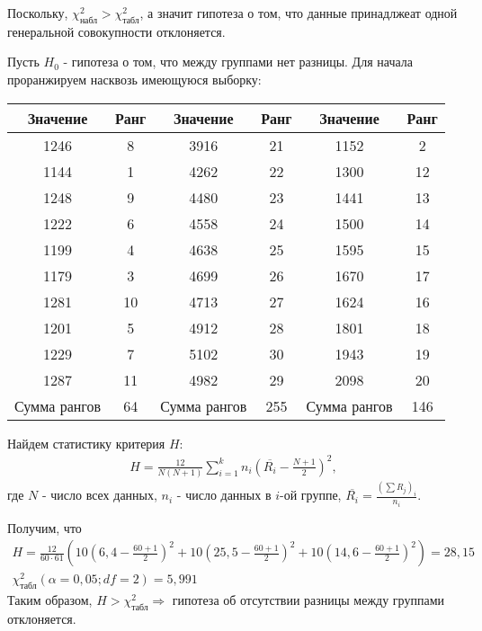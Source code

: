 \documentclass[utf8, a4paper, 14pt, russian, oneside]{book}
\begin{document}
Поскольку, $\chi^2_{\text{набл}} > \chi^2_{\text{табл}}$, а значит гипотеза о том, что данные принадлжеат одной генеральной совокупности отклоняется.

\newpage


Пусть $H_0$ - гипотеза о том, что между группами нет разницы. Для начала проранжируем насквозь имеющуюся выборку:
\begin{table}[h!]
    \centering
    \begin{tabular}{|c|c|c|c|c|c|}
        \hline
        Значение & Ранг & Значение & Ранг & Значение & Ранг \\ \hline
        1246 & 8  & 3916 & 21 & 1152 & 2  \\ \hline 
        1144 & 1  & 4262 & 22 & 1300 & 12 \\ \hline 
        1248 & 9  & 4480 & 23 & 1441 & 13 \\ \hline 
        1222 & 6  & 4558 & 24 & 1500 & 14 \\ \hline 
        1199 & 4  & 4638 & 25 & 1595 & 15 \\ \hline 
        1179 & 3  & 4699 & 26 & 1670 & 17 \\ \hline 
        1281 & 10 & 4713 & 27 & 1624 & 16 \\ \hline 
        1201 & 5  & 4912 & 28 & 1801 & 18 \\ \hline 
        1229 & 7  & 5102 & 30 & 1943 & 19 \\ \hline 
        1287 & 11 & 4982 & 29 & 2098 & 20 \\ \hline 
        Сумма рангов & 64 & Сумма рангов & 255 & Сумма рангов & 146 \\ \hline
    \end{tabular} 
\end{table}

Найдем статистику критерия $H$:
\begin{align*}
    H = \frac{12}{N(N+1)} \sum_{i=1}^k n_i \left(\overline{R_i} - \frac{N+1}{2}\right)^2,
\end{align*}
где $N$ - число всех данных, $n_i$ - число данных в $i$-ой группе, $\overline{R_i} = \tfrac{(\sum R_j)_i}{n_i}$.

Получим, что
\begin{gather*}
    H = \frac{12}{60 \cdot 61} \left(
        10\left(6,4 -  \tfrac{60 + 1}{2}\right)^2 + 
        10\left(25,5 - \tfrac{60 + 1}{2}\right)^2 + 
        10\left(14,6 - \tfrac{60 + 1}{2}\right)^2
    \right) = 28,15\\
    \chi^2_{\text{табл}}(\alpha = 0,05; df=2)=5,991
\end{gather*}
Таким образом, $H > \chi^2_{\text{табл}} \Rightarrow$ гипотеза об отсутствии разницы между группами отклоняется.
\end{document}
